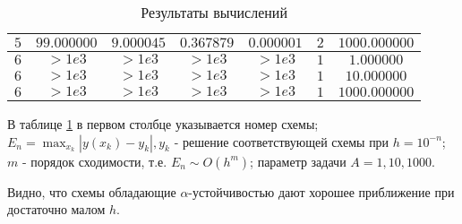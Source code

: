 \documentclass[14pt,a4paper]{extarticle}
\newcommand{\1}{\mathbbm{1}}
\begin{document}
\begin{table}[h!]
\begin{center}
\begin{tabular}{|c|c|c|c|c|c|c|}
     $5$ &  $99.000000$ & $9.000045$ & $0.367879$ & $0.000001$ & $2$ & $1000.000000$ \\ \hline 
    
     $6$ &  $>1e3$ & $>1e3$ & $>1e3$ & $>1e3$ & $1$ & $1.000000$ \\ \hline 
    
     $6$ &  $>1e3$ & $>1e3$ & $>1e3$ & $>1e3$ & $1$ & $10.000000$ \\ \hline 
    
     $6$ &  $>1e3$ & $>1e3$ & $>1e3$ & $>1e3$ & $1$ & $1000.000000$ \\ \hline 
    \end{tabular} 
    \end{center}\caption{Результаты вычислений}  
    \label{Aggreg1CU} \end{table} 
     
     
     

    В таблице \ref{Aggreg1CU} в первом столбце указывается номер схемы;
    $E_n=\max _{x_k}\left|y\left(x_k\right)-y_k\right|, y_k$ 
    - решение соответствующей схемы при $h=10^{-n}$; $m$ - порядок сходимости, т.е. $E_n \sim O\left(h^m\right)$;
    параметр задачи $A=1,10,1000$. 
    \par
    Видно, что схемы обладающие $\alpha$-устойчивостью дают хорошее приближение при достаточно малом $h$. 
     
     
\end{document}
